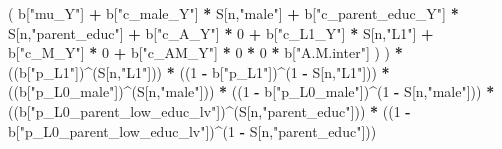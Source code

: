 \documentclass[
]{book}
\newenvironment{Shaded}{\begin{snugshade}}{\end{snugshade}}
\newcommand{\DecValTok}[1]{\textcolor[rgb]{0.00,0.00,0.81}{#1}}
\newcommand{\NormalTok}[1]{#1}
\newcommand{\SpecialCharTok}[1]{\textcolor[rgb]{0.81,0.36,0.00}{\textbf{#1}}}
\newcommand{\StringTok}[1]{\textcolor[rgb]{0.31,0.60,0.02}{#1}}
\begin{document}
\begin{Shaded}
\begin{Highlighting}[]
\NormalTok{                          ( b[}\StringTok{"mu\_Y"}\NormalTok{] }\SpecialCharTok{+} 
\NormalTok{                              b[}\StringTok{"c\_male\_Y"}\NormalTok{] }\SpecialCharTok{*}\NormalTok{ S[n,}\StringTok{"male"}\NormalTok{] }\SpecialCharTok{+} 
\NormalTok{                              b[}\StringTok{"c\_parent\_educ\_Y"}\NormalTok{] }\SpecialCharTok{*}\NormalTok{ S[n,}\StringTok{"parent\_educ"}\NormalTok{] }\SpecialCharTok{+} 
\NormalTok{                              b[}\StringTok{"c\_A\_Y"}\NormalTok{] }\SpecialCharTok{*} \DecValTok{0} \SpecialCharTok{+} 
\NormalTok{                              b[}\StringTok{"c\_L1\_Y"}\NormalTok{] }\SpecialCharTok{*}\NormalTok{ S[n,}\StringTok{"L1"}\NormalTok{] }\SpecialCharTok{+}
\NormalTok{                              b[}\StringTok{"c\_M\_Y"}\NormalTok{] }\SpecialCharTok{*} \DecValTok{0} \SpecialCharTok{+}
\NormalTok{                              b[}\StringTok{"c\_AM\_Y"}\NormalTok{] }\SpecialCharTok{*} \DecValTok{0} \SpecialCharTok{*} \DecValTok{0} \SpecialCharTok{*}\NormalTok{ b[}\StringTok{"A.M.inter"}\NormalTok{] ) ) }\SpecialCharTok{*}
\NormalTok{      ((b[}\StringTok{"p\_L1"}\NormalTok{])}\SpecialCharTok{\^{}}\NormalTok{(S[n,}\StringTok{"L1"}\NormalTok{])) }\SpecialCharTok{*}
\NormalTok{      ((}\DecValTok{1} \SpecialCharTok{{-}}\NormalTok{ b[}\StringTok{"p\_L1"}\NormalTok{])}\SpecialCharTok{\^{}}\NormalTok{(}\DecValTok{1} \SpecialCharTok{{-}}\NormalTok{ S[n,}\StringTok{"L1"}\NormalTok{])) }\SpecialCharTok{*}
\NormalTok{      ((b[}\StringTok{"p\_L0\_male"}\NormalTok{])}\SpecialCharTok{\^{}}\NormalTok{(S[n,}\StringTok{"male"}\NormalTok{])) }\SpecialCharTok{*} 
\NormalTok{      ((}\DecValTok{1} \SpecialCharTok{{-}}\NormalTok{ b[}\StringTok{"p\_L0\_male"}\NormalTok{])}\SpecialCharTok{\^{}}\NormalTok{(}\DecValTok{1} \SpecialCharTok{{-}}\NormalTok{ S[n,}\StringTok{"male"}\NormalTok{])) }\SpecialCharTok{*} 
\NormalTok{      ((b[}\StringTok{"p\_L0\_parent\_low\_educ\_lv"}\NormalTok{])}\SpecialCharTok{\^{}}\NormalTok{(S[n,}\StringTok{"parent\_educ"}\NormalTok{])) }\SpecialCharTok{*}
\NormalTok{      ((}\DecValTok{1} \SpecialCharTok{{-}}\NormalTok{ b[}\StringTok{"p\_L0\_parent\_low\_educ\_lv"}\NormalTok{])}\SpecialCharTok{\^{}}\NormalTok{(}\DecValTok{1} \SpecialCharTok{{-}}\NormalTok{ S[n,}\StringTok{"parent\_educ"}\NormalTok{])) }
    

\end{Highlighting}
\end{Shaded}
\end{document}
